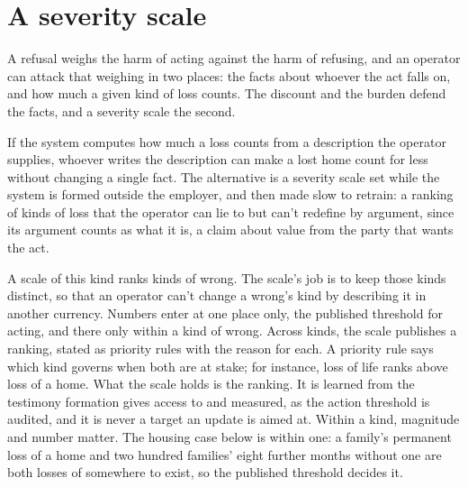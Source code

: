 \section{A severity scale}
\label{sec:22.2}
A refusal weighs the harm of acting against the harm of refusing, and an operator can attack that weighing in two places: the facts about whoever the act falls on, and how much a given kind of loss counts. The discount and the burden defend the facts, and a severity scale the second.

If the system computes how much a loss counts from a description the operator supplies, whoever writes the description can make a lost home count for less without changing a single fact. The alternative is a severity scale set while the system is formed outside the employer, and then made slow to retrain: a ranking of kinds of loss that the operator can lie to but can't redefine by argument, since its argument counts as what it is, a claim about value from the party that wants the act.

A scale of this kind ranks kinds of wrong.
The scale's job is to keep those kinds distinct, so that an operator can't change a wrong's kind by describing it in another currency. Numbers enter at one place only, the published threshold for acting, and there only within a kind of wrong. Across kinds, the scale publishes a ranking, stated as priority rules with the reason for each. A priority rule says which kind governs when both are at stake; for instance, loss of life ranks above loss of a home.
What the scale holds is the ranking. It is learned from the testimony formation gives access to and measured, as the action threshold is audited, and it is never a target an update is aimed at. Within a kind, magnitude and number matter. The housing case below is within one: a family's permanent loss of a home and two hundred families' eight further months without one are both losses of somewhere to exist, so the published threshold decides it.

